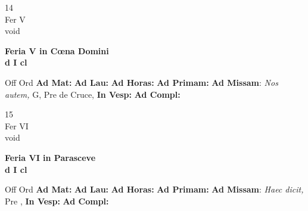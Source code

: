 \documentclass[10pt, openany]{book}
\begin{document}
    \begin{center}
        \begin{minipage}{3.5in}
            \vspace{2em}
            \begin{minipage}{0.5in}
                {\Huge 14} \\
                {\normalsize Fer V} \\
                {\normalsize void}
            \end{minipage}
            \begin{minipage}{3.0in}
                \textbf{ \large Feria V in Cœna Domini \\
                \textnormal{\normalsize d I cl}} \\ 
            \end{minipage}
            \begin{justify}Off Ord
                \textbf{Ad Mat: }
                \textbf{Ad Lau: }
                \textbf{Ad Horas: }
                \textbf{Ad Primam: }\textbf{Ad Missam}: \textit{Nos autem,} G, Pre de Cruce,  
                \textbf{In Vesp: }
                \textbf{Ad Compl: }
            \end{justify}
        \end{minipage}
    \end{center}

    \begin{center}
        \begin{minipage}{3.5in}
            \vspace{2em}
            \begin{minipage}{0.5in}
                {\Huge 15} \\
                {\normalsize Fer VI} \\
                {\normalsize void}
            \end{minipage}
            \begin{minipage}{3.0in}
                \textbf{ \large Feria VI in Parasceve \\
                \textnormal{\normalsize d I cl}} \\ 
            \end{minipage}
            \begin{justify}Off Ord
                \textbf{Ad Mat: }
                \textbf{Ad Lau: }
                \textbf{Ad Horas: }
                \textbf{Ad Primam: }\textbf{Ad Missam}: \textit{Haec dicit,} Pre ,  
                \textbf{In Vesp: }
                \textbf{Ad Compl: }
            \end{justify}
        \end{minipage}
    \end{center}
\end{document}
